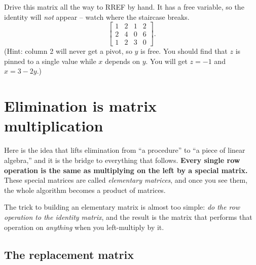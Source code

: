 \begin{labbox}
Drive this matrix all the way to RREF by hand. It has a free variable, so the
identity will \emph{not} appear -- watch where the staircase breaks.
\[
\left[\begin{array}{ccc|c}
1 & 2 & 1 & 2\\
2 & 4 & 0 & 6\\
1 & 2 & 3 & 0
\end{array}\right].
\]
(Hint: column 2 will never get a pivot, so $y$ is free. You should find that
$z$ is pinned to a single value while $x$ depends on $y$. You will get
$z=-1$ and $x=3-2y$.)
\end{labbox}

\section{Elimination is matrix multiplication}

Here is the idea that lifts elimination from ``a procedure'' to ``a piece of
linear algebra,'' and it is the bridge to everything that follows. \textbf{Every
single row operation is the same as multiplying on the left by a special
matrix.} These special matrices are called \emph{elementary matrices}, and once
you see them, the whole algorithm becomes a product of matrices.

The trick to building an elementary matrix is almost too simple: \emph{do the row
operation to the identity matrix}, and the result is the matrix that performs
that operation on \emph{anything} when you left-multiply by it.

\subsection{The replacement matrix}

